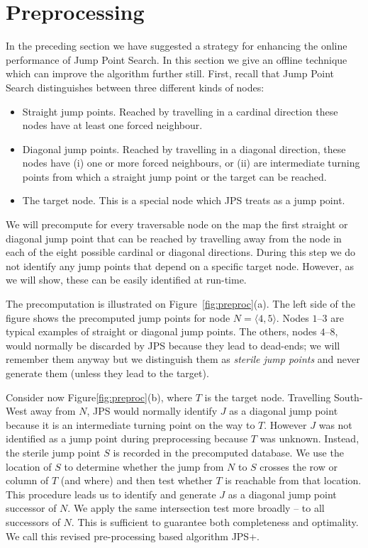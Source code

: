 \section{Preprocessing}
\label{sec::preprocessing}
In the preceding section we have suggested a strategy for enhancing the
online performance of Jump Point Search.  In this section we give an offline
technique which can improve the algorithm further still. First, recall that 
Jump Point Search distinguishes between three different kinds of
nodes:
\begin{itemize}
\item Straight jump points. Reached by travelling in a
cardinal direction these nodes have at least one forced neighbour.
\item Diagonal jump points. Reached by travelling in a diagonal direction, 
these nodes have (i) one or more forced neighbours, or (ii) are 
intermediate turning points from which a straight jump point or the 
target can be reached.
\item The target node. This is a special node which JPS treats as a jump point.
\end{itemize}

We will precompute for every traversable node on the map the first
straight or diagonal jump point that can be reached by travelling 
away from the node in each of the eight possible cardinal or diagonal 
directions. During this step we do not identify any jump points that 
depend on a specific target node.  However, as we will show, these 
can be easily identified at run-time. 

The precomputation is illustrated on Figure~\ref{fig:preproc}(a).
The left side of the figure shows the precomputed jump points 
for node $N = \langle 4,5\rangle$.  
Nodes $1$--$3$ are typical examples of straight or diagonal 
jump points.  
The others, nodes $4$--$8$, would normally be discarded 
by JPS because they lead to dead-ends; we will remember them 
anyway but we distinguish them as \emph{sterile jump points} and never
generate them (unless they lead to the target).

Consider now Figure\ref{fig:preproc}(b), where $T$ is the target node.  
Travelling South-West away from $N$, JPS would normally identify 
$J$ as a diagonal jump point because it is an intermediate turning
point on the way to $T$.
However $J$ was not identified as a jump point during preprocessing 
because $T$ was unknown.  
Instead, the sterile jump point $S$ is recorded in the precomputed 
database. We use the location of $S$ to determine whether the jump from 
$N$ to $S$ crosses the row or column of $T$ (and where) and then test 
whether $T$ is reachable from that location. This procedure 
leads us to identify and generate $J$ as a diagonal jump point successor
of $N$. We apply the same intersection test more broadly -- to all 
successors of $N$. This is sufficient to guarantee both completeness 
and optimality. We call this revised pre-processing based algorithm 
JPS+.
